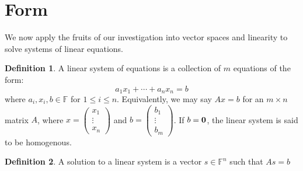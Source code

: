 \documentclass[oneside, 12pt]{book}
\theoremstyle{definition}
\newtheorem{defn}{Definition}[section]
\begin{document}
\section{Form}
We now apply the fruits of our investigation into vector spaces and linearity to solve systems of linear equations.
\begin{defn}
\label{def_linsys}
  A linear system of equations is a collection of $m$ equations of the form:
  \[ a_{1}x_{1}+ \cdots +a_{n}x_{n}=b \] where $a_{i}, x_{i},b \in \mathbb{F}$ for $1 \leq i \leq n$.
  Equivalently, we may say
  $Ax=b$ for an $m \times n$ matrix $A$, where $x= \begin{pmatrix} x_{1} \\ \vdots \\ x_{n}\end{pmatrix}$ and $b= \begin{pmatrix} b_{1} \\ \vdots \\ b_{m}\end{pmatrix}$.
  If $b=\bold{0}$, the linear system is said to be homogenous.
\end{defn}
\begin{defn}
\label{def_soln}
A solution to a linear system is a vector $s \in \mathbb{F}^{n}$ such that $As=b$
\end{defn}
\end{document}
